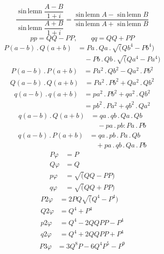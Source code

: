 \[
\dfrac{\operatorname{sin\,lemn}\dfrac{A-B}{1+i}}
{\operatorname{sin\,lemn}\dfrac{A+B}{1+i}}
=\dfrac{\operatorname{sin\,lemn}A-\operatorname{sin\,lemn}B}
{\operatorname{sin\,lemn}A+\operatorname{sin\,lemn}B}
\]
\[
pp=QQ-PP,\qquad qq=QQ+PP
\]
\[
\begin{aligned}P(a-b)\, .\,Q(a+b)&=Pa\, .\,Qa\, .\,\surd(Qb^4-Pb^4)\\[5pt]&\quad{}-Pb\, .\,Qb\, .\,\surd(Qa^4-Pa^4)\end{aligned}
\]
\[
\begin{aligned}P(a-b)\, .\,P(a+b)&=Pa^2\, .\,Qb^2-Qa^2\, .\,Pb^2\end{aligned}
\]
\[
\begin{aligned}Q(a-b)\, .\,Q(a+b)&=Pa^2\, .\,Pb^2+Qa^2\, .\,Qb^2\end{aligned}
\]
\[
\begin{aligned}
q(a-b)\, .\,q(a+b)&=pa^2\, .\,Pb^2+qa^2\, .\,Qb^2\\
&=pb^2\, .\,Pa^2+qb^2\, .\,Qa^2
\end{aligned}
\]
\[
\begin{aligned}q(a-b)\, .\,Q(a+b)&=qa\, .\,qb\, .\,Qa\, .\,Qb\\[5pt]&\quad{}-pa\, .\,pb:Pa\, .\,Pb\end{aligned}
\]
\[
\begin{aligned}q(a-b)\, .\,P(a+b)&=qa\, .\,pb\, .\,Pa\, .\,Qb\\[5pt]&\quad{}+pa\, .\,qb\, .\,Qa\, .\,Pb\end{aligned}
\]
\[
\begin{aligned}
P\varphi&=P\\[4pt]
Q\varphi&=Q\\[4pt]
p\varphi&=\surd(QQ-PP)\\[4pt]
q\varphi&=\surd(QQ+PP)
\end{aligned}
\]
\[
\begin{aligned}
P2\varphi&=2PQ\surd(Q^4-P^4)\\[4pt]
Q2\varphi&=Q^4+P^4\\[4pt]
p2\varphi&=Q^4-2QQPP-P^4\\[4pt]
q2\varphi&=Q^4+2QQPP+P^4
\end{aligned}
\]
\[
\begin{aligned}P3\varphi&=3Q^8P-6Q^4P^5-P^9\end{aligned}
\]
